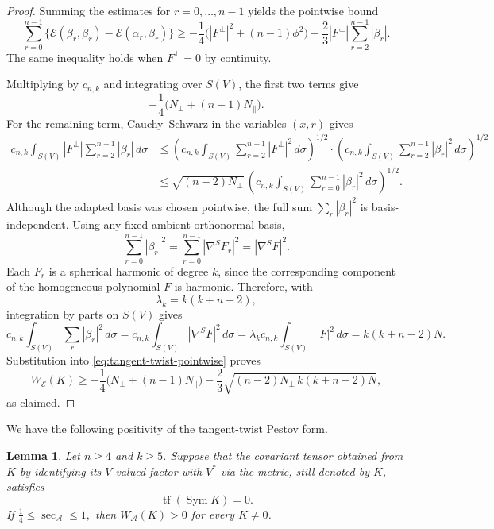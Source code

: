 \documentclass[reqno,11pt]{amsart}
\newtheorem{lemma}[theorem]{Lemma}
\theoremstyle{definition}
\newcommand{\cA}{\mathcal A}
\newcommand{\cE}{\mathcal E}
\newcommand{\Sym}{\operatorname{Sym}}
\newcommand{\tf}{\operatorname{tf}}
\begin{document}
\begin{proof}
Summing the estimates for $r=0,\ldots,n-1$ yields the pointwise bound
\begin{equation}\label{eq:tangent-twist-pointwise}
  \sum_{r=0}^{n-1}
  \bigl\{\cE(\beta_r,\beta_r)-\cE(\alpha_r,\beta_r)\bigr\}
  \geq
  -\frac14\bigl(|F^\perp|^2+(n-1)\phi^2\bigr)
  -\frac23|F^\perp|
     \sum_{r=2}^{n-1}|\beta_r|.
\end{equation}
The same inequality holds when $F^\perp=0$ by continuity.

Multiplying by $c_{n,k}$ and integrating over $S(V)$, the first two
terms give
$$
  -\frac14\bigl(N_{\perp}+(n-1)N_{\parallel}\bigr).
$$
For the remaining term, Cauchy--Schwarz in the variables $(x,r)$ gives
\begin{align*}
  c_{n,k}\int_{S(V)}
  |F^\perp|\sum_{r=2}^{n-1}|\beta_r|\,d\sigma
  &\leq
  \left(
    c_{n,k}\int_{S(V)}
    \sum_{r=2}^{n-1}|F^\perp|^2\,d\sigma
  \right)^{1/2}\cdot
  \left(
    c_{n,k}\int_{S(V)}
    \sum_{r=2}^{n-1}|\beta_r|^2\,d\sigma
  \right)^{1/2}                                      \\
  &\leq
  \sqrt{(n-2)N_{\perp}}\,
  \left(
    c_{n,k}\int_{S(V)}
    \sum_{r=0}^{n-1}|\beta_r|^2\,d\sigma
  \right)^{1/2}.
\end{align*}
Although the adapted basis was chosen pointwise, the full sum
$\sum_r|\beta_r|^2$ is basis-independent. Using any fixed ambient
orthonormal basis,
$$
  \sum_{r=0}^{n-1}|\beta_r|^2
  =\sum_{r=0}^{n-1}|\nabla^S F_r|^2
  =|\nabla^S F|^2.
$$
Each $F_r$ is a spherical harmonic of degree $k$, since the corresponding
component of the homogeneous polynomial $F$ is harmonic. Therefore, with
$$
  \lambda_k=k(k+n-2),
$$
integration by parts on $S(V)$ gives
$$
  c_{n,k}\int_{S(V)}\sum_r|\beta_r|^2\,d\sigma
  =
  c_{n,k}\int_{S(V)}|\nabla^S F|^2\,d\sigma
  =
  \lambda_k c_{n,k}\int_{S(V)}|F|^2\,d\sigma
  =
  k(k+n-2)N.
$$
Substitution into \eqref{eq:tangent-twist-pointwise} proves
$$
  W_{\cE}(K)
  \geq-\frac14\bigl(N_{\perp}+(n-1)N_{\parallel}\bigr)
  -\frac23
   \sqrt{(n-2)N_{\perp}\,k(k+n-2)N},
$$
as claimed.
\end{proof}

We have the following positivity of the tangent-twist Pestov form.
\begin{lemma}
\label{lem:tangent-twist-high-degree}
Let $n\geq4$ and $k\geq5$. Suppose that the covariant tensor obtained from $K$ by identifying its
$V$-valued factor with $V^*$ via the metric, still denoted by $K$,
satisfies
\begin{equation}\label{eq:highest-normal-condition}
  \tf(\Sym K)=0.
\end{equation}
If
$
  \frac14\leq\sec_{\cA}\leq1,
$
then
$
  W_{\cA}(K)>0
$
for every $K\neq0$.
\end{lemma}
\end{document}
